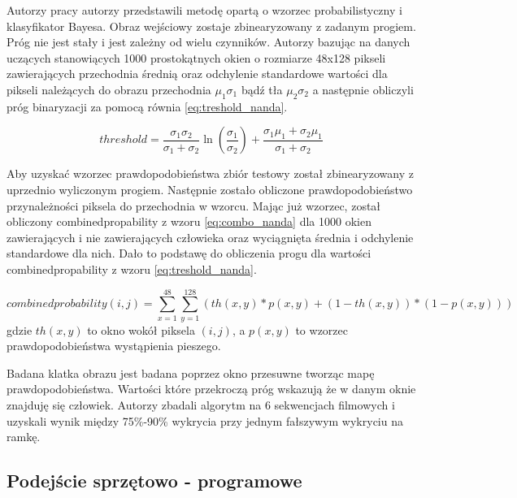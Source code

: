 Autorzy pracy \cite{nanda_2002} autorzy przedstawili metodę opartą o wzorzec probabilistyczny i klasyfikator Bayesa. Obraz wejściowy zostaje zbinearyzowany z zadanym progiem. Próg nie jest stały i jest zależny od wielu czynników. Autorzy bazując na danych uczących stanowiących 1000 prostokątnych okien o rozmiarze 48x128 pikseli zawierających przechodnia średnią oraz odchylenie standardowe wartości dla pikseli należących do obrazu przechodnia \( \mu_1 \sigma_1 \) bądź tła \( \mu_2 \sigma_2 \) a następnie obliczyli próg binaryzacji za pomocą równia \ref{eq:treshold_nanda}.

\begin{equation} \label{eq:treshold_nanda}
threshold =  \frac{\sigma_1 \sigma_2}{ \sigma_1 + \sigma_2} \ln\left ( \frac{\sigma_1}{\sigma_2} \right ) + \frac{\sigma_1\mu_1 + \sigma_2\mu_1}{\sigma_1+\sigma_2}\end{equation}

Aby uzyskać wzorzec prawdopodobieństwa zbiór testowy został zbinearyzowany z uprzednio wyliczonym progiem. Następnie zostało obliczone prawdopodobieństwo przynależności piksela do przechodnia w wzorcu. Mając już wzorzec, został obliczony combinedpropability z wzoru \ref{eq:combo_nanda} dla 1000 okien zawierających i nie zawierających człowieka oraz wyciągnięta średnia i odchylenie standardowe dla nich. Dało to podstawę do obliczenia progu dla wartości combinedpropability z wzoru \ref{eq:treshold_nanda}. 

\begin{equation} \label{eq:combo_nanda} combinedprobability(i,j)=\sum_{x=1}^{48}\sum_{y=1}^{128}(th(x,y)*p(x,y)+(1-th(x,y))*(1-p(x,y)))\end{equation}
\noindent
 gdzie \(th(x,y)\) to okno wokół piksela \((i,j)\), a \(p(x,y)\) to wzorzec prawdopodobieństwa wystąpienia pieszego.

 Badana klatka obrazu jest badana poprzez okno przesuwne tworząc mapę prawdopodobieństwa. Wartości które przekroczą próg wskazują że w danym oknie znajduję się człowiek. Autorzy zbadali algorytm na 6 sekwencjach filmowych i uzyskali wynik między 75\%-90\% wykrycia przy jednym fałszywym wykryciu na ramkę.


\subsection{Podejście sprzętowo - programowe}


